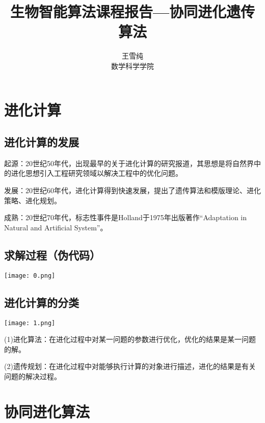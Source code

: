 \documentclass[8pt]{article}
\begin{document}
  
\title{生物智能算法课程报告—协同进化遗传算法 }  
\author { 王雪纯\\数学科学学院}  
\maketitle    
\section{进化计算}  
\vspace{0.1cm}  
\subsection{进化计算的发展}
\begin{description}
        	\item 起源：20世纪50年代，出现最早的关于进化计算的研究报道，其思想是将自然界中的进化思想引入工程研究领域以解决工程中的优化问题。
	\item 发展：20世纪60年代，进化计算得到快速发展，提出了遗传算法和模版理论、进化策略、进化规划。
	\item 成熟：20世纪70年代，标志性事件是Holland于1975年出版著作“Adaptation in Natural and Artificial System”。
	\end{description}
	
\subsection{求解过程（伪代码）}
\texttt{[image: 0.png]}

\subsection{进化计算的分类}
        \texttt{[image: 1.png]}
\begin{description}    
        \item (1)进化算法：在进化过程中对某一问题的参数进行优化，优化的结果是某一问题的解。
	\item (2)遗传规划：在进化过程中对能够执行计算的对象进行描述，进化的结果是有关问题的解决过程。
	\end{description}
 \section{协同进化算法}
\end{document}
